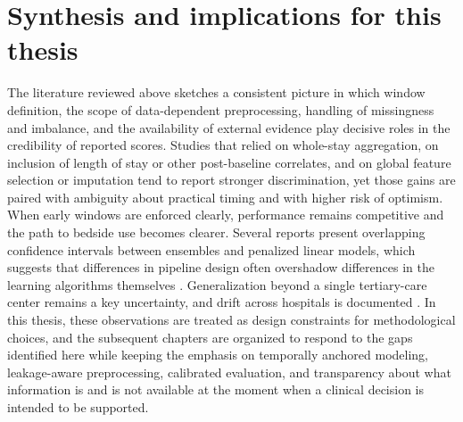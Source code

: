 \section{Synthesis and implications for this thesis}
The literature reviewed above sketches a consistent picture in which window definition, the scope of data-dependent preprocessing, handling of missingness and imbalance, and the availability of external evidence play decisive roles in the credibility of reported scores. Studies that relied on whole-stay aggregation, on inclusion of length of stay or other post-baseline correlates, and on global feature selection or imputation tend to report stronger discrimination, yet those gains are paired with ambiguity about practical timing and with higher risk of optimism. When early windows are enforced clearly, performance remains competitive and the path to bedside use becomes clearer. Several reports present overlapping confidence intervals between ensembles and penalized linear models, which suggests that differences in pipeline design often overshadow differences in the learning algorithms themselves \citep{Kang_Yoon_2023}. Generalization beyond a single tertiary-care center remains a key uncertainty, and drift across hospitals is documented \citep{Johnson_2023_MIMIC,Rockenschaub_2024}. In this thesis, these observations are treated as design constraints for methodological choices, and the subsequent chapters are organized to respond to the gaps identified here while keeping the emphasis on temporally anchored modeling, leakage-aware preprocessing, calibrated evaluation, and transparency about what information is and is not available at the moment when a clinical decision is intended to be supported.
